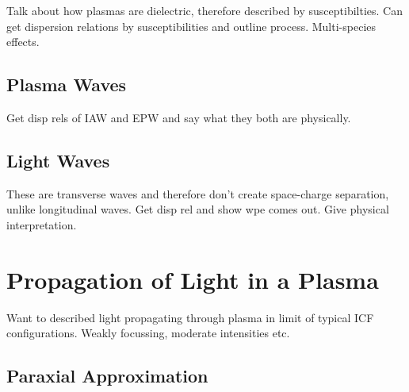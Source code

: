 Talk about how plasmas are dielectric, therefore described by susceptibilties.
Can get dispersion relations by susceptibilities and outline process.
Multi-species effects.

\subsection{Plasma Waves}%
\label{sec:theory_longwaves}

Get disp rels of IAW and EPW and say what they both are physically.

\subsection{Light Waves}%
\label{sec:theory_transwaves}

These are transverse waves and therefore don't create space-charge separation, unlike longitudinal waves.
Get disp rel and show wpe comes out.
Give physical interpretation.

\section{Propagation of Light in a Plasma}%
\label{sec:theory_propagation}

Want to described light propagating through plasma in limit of typical ICF configurations.
Weakly focussing, moderate intensities etc.


\subsection{Paraxial Approximation}%
\label{sec:theory_paraxial}

